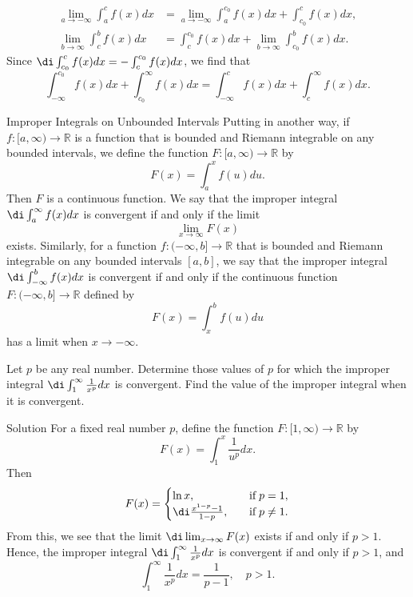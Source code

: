 \begin{example}[label=20230527]{}
\begin{remark}{}
 \begin{align*}\lim_{a\to-\infty}\int_a^cf(x)dx&=\lim_{a\to-\infty}\int_a^{c_0}f(x)dx+\int_{c_0}^cf(x)dx,\\
\lim_{b\to\infty}\int_c^bf(x)dx&=\int_{c}^{c_0}f(x)dx+\lim_{b\to\infty}\int_{c_0}^bf(x)dx.\end{align*}
Since $\di \int_{c_0}^cf(x)dx=-\int_{c}^{c_0}f(x)dx$, we find that
\[\int_{-\infty}^{c_0}f(x)dx+\int_{c_0}^{\infty}f(x)dx=\int_{-\infty}^{c}f(x)dx+\int_{c}^{\infty}f(x)dx.\]
\end{remark}
\begin{highlight}{Improper Integrals on Unbounded Intervals}
Putting in another way, if $f:[a,\infty)\to\mathbb{R}$ is a function that is bounded and Riemann integrable on any bounded intervals, we define the function $F:[a,\infty)\to\mathbb{R}$ by
\[F(x)=\int_a^{x}f(u)du.\]
Then $F$ is a continuous function. We say that the improper integral $\di\int_a^{\infty}f(x)dx$ is convergent if and only if the limit
\[\lim_{x\to\infty}F(x)\] exists.
Similarly, for a function $f:(-\infty, b]\to\mathbb{R}$ that is bounded and Riemann integrable on any bounded intervals $[a,b]$, we say that the improper integral $\di\int_{-\infty}^bf(x)dx$ is convergent if and only if the continuous function $F:(-\infty, b]\to\mathbb{R}$ defined by
\[F(x)=\int_{x}^b f(u)du\] has a limit when $x\to-\infty$.
\end{highlight}

\begin{example}{}
Let $p$ be any real number. Determine those values of $p$ for which the improper integral $\di\int_1^{\infty}\frac{1}{x^p}dx$ is convergent. Find the value of the improper integral when it is convergent.
\end{example}
\begin{solution}{Solution}
For a fixed real number $p$, define the function $F:[1,\infty)\to\mathbb{R}$ by
\[F(x)=\int_1^x\frac{1}{u^p}dx.\]\bs
Then
\begin{align*}
F(x)=\begin{cases} \ln x,\quad &\text{if}\; p=1,\\
\di\frac{x^{1-p}-1}{1-p},\quad &\text{if}\;p\neq 1.\end{cases}
\end{align*}From this, we see that the limit $\di\lim_{x\to\infty}F(x)$ exists if and only if $p>1$. Hence, the improper integral  $\di\int_1^{\infty}\frac{1}{x^p}dx$ is convergent if and only if $p>1$, and
\[  \int_1^{\infty}\frac{1}{x^p}dx=\frac{1}{p-1},\quad p>1.\]
\end{solution}


\end{example}
